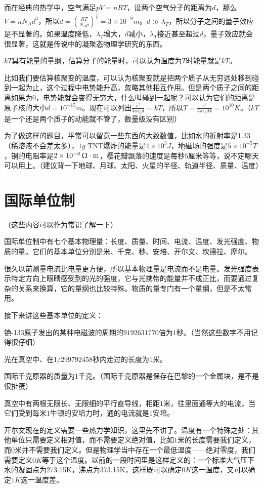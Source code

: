 而在经典的热学中，空气满足$p V=n R T$，设两个空气分子的距离为$d$，那么$V=n N_A d^3$，所以$d=(\frac{R T}{N_A p})^{\frac{1}{3}}=3 \times 10^{-9} \unit{m}$。$d \gg \lambda_T$，所以分子之间的量子效应是不显著的。如果温度降低，$\lambda_T$增大，$d$减小，$\lambda_T$接近甚至超过$d$，量子效应就会很显著，这就是传说中的凝聚态物理学研究的东西。

$k T$具有能量的量纲，估算分子的能量时，可以认为温度为$T$时能量就是$k T$。

比如我们要估算核聚变的温度，可以认为核聚变就是把两个质子从无穷远处移到碰到一起为止，这个过程中电势能升高，忽略其他相互作用。但是两个质子之间的距离如果为$0$，电势能就会变得无穷大，什么叫碰到一起呢？可以认为它们的距离是原子核的大小$d=10^{-15} \unit{m}$。现在可以列出$\frac{e^2}{4 \pi \epsilon_0 d}=k T$，所以$T=\frac{e^2}{4 \pi \epsilon_0 d k}=10^{10} \unit{K}$。（$k T$是一个还是两个质子的动能就不管了，数量级没有区别）

为了做这样的题目，平常可以留意一些东西的大致数值，比如水的折射率是1.33（稀溶液不会差太多），$1 \unit{g}$ TNT爆炸的能量是$4 \times 10^3 \unit{J}$，地磁场的强度是$5 \times 10^{-5} \unit{T}$，铜的电阻率是$2 \times 10^{-8} \,{\rm \Upomega \cdot m}$，樱花瓣飘落的速度是每秒$5$厘米等等，说不定哪天可以用上。（建议背一下地球、月球、太阳、火星的半径、轨道半径、质量、温度）
\section{国际单位制}
（这些内容可以作为常识了解一下）

国际单位制中有七个基本物理量：长度、质量、时间、电流、温度、发光强度、物质的量。它们的基本单位分别是米、千克、秒、安培、开尔文、坎德拉、摩尔。

很久以前测量电流比电量更方便，所以基本物理量是电流而不是电量。发光强度表示特定方向上眼睛感受到的光的强度，它与光携带的能量并不成正比，而要通过复杂的关系来换算，它的量纲也比较特殊。物质的量专门有一个量纲，但是不太常用。

接下来讲这些基本单位的定义：

铯-133原子发出的某种电磁波的周期的$9192631770$倍为$1$秒。（当然这些数字不用记得很仔细）

光在真空中、在$1/299792458$秒内走过的长度为$1$米。

国际千克原器的质量为$1$千克。（国际千克原器是保存在巴黎的一个金属块，是不是很扯蛋）

真空中有两根无限长、无限细的平行直导线，相距$1$米，往里面通等大的电流，当它们受到每米$1$牛顿的安培力时，通的电流就是$1$安培。

开尔文现在的定义需要一些热力学知识，这里先不讲了。温度有一个特殊之处：其他单位只需要定义相对值，而不需要定义绝对值，比如$1$米的长度需要我们定义，而$0$米并不需要我们定义。但是物理学当中存在一个最低温度——绝对零度，我们需要定义$0 \unit{K}$等于这个温度。以前的一段时间里是这样定义的：一个标准大气压下水的凝固点为273.15K，沸点为373.15K，这样既可以确定$0 \unit{K}$这一温度，又可以确定$1 \unit{K}$这一温度差。

